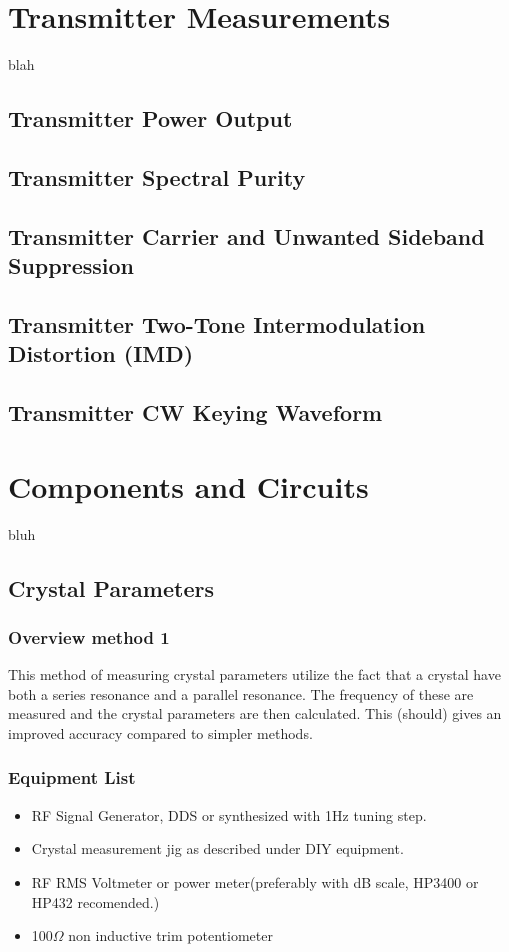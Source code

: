 \documentclass[10pt,letterpaper]{book}
\begin{document}
\chapter{Transmitter Measurements}
blah
\section{Transmitter Power Output}
\section{Transmitter Spectral Purity}
\section{Transmitter Carrier and Unwanted Sideband Suppression}
\section{Transmitter Two-Tone Intermodulation Distortion (IMD)}
\section{Transmitter CW Keying Waveform}
\chapter{Components and Circuits}
bluh
\section{Crystal Parameters}

\subsection*{Overview method 1}
This method of measuring crystal parameters utilize the fact that a crystal have both a series resonance and a parallel resonance. The frequency of these are measured and the crystal parameters are then calculated. This (should) gives an improved accuracy compared to simpler methods. 
\subsection*{Equipment List}
\begin{itemize}
	\item RF Signal Generator, DDS or synthesized with 1Hz tuning step.
	\item Crystal measurement jig as described under DIY equipment.
	\item RF RMS Voltmeter or power meter(preferably with dB scale, HP3400 or HP432 recomended.) 
	\item 100$\Omega$ non inductive trim potentiometer
\end{itemize}
\end{document}
